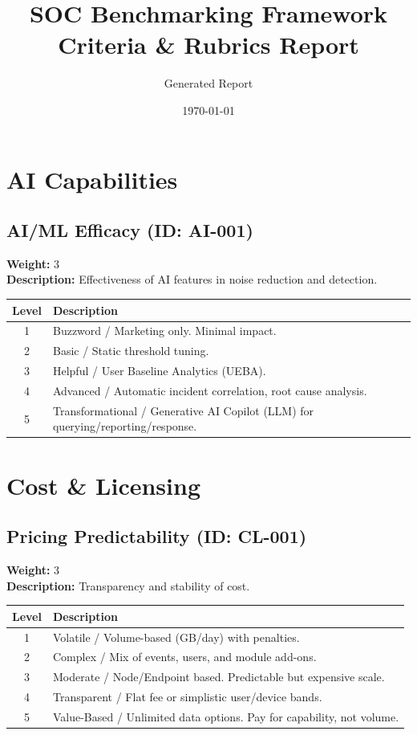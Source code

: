 \documentclass{article}
\title{SOC Benchmarking Framework \\ Criteria & Rubrics Report}
\author{Generated Report}
\date{\today}
\begin{document}
\maketitle
\tableofcontents
\newpage

\section{AI Capabilities}
\subsection{AI/ML Efficacy (ID: AI-001)}
\textbf{Weight:} 3 \\
\textbf{Description:} Effectiveness of AI features in noise reduction and detection.
\vspace{0.3cm}
\begin{longtable}{|c|p{12cm}|}
\hline
\rowcolor{lightgray} \textbf{Level} & \textbf{Description} \\ \hline
1 & Buzzword / Marketing only. Minimal impact. \\ \hline
2 & Basic / Static threshold tuning. \\ \hline
3 & Helpful / User Baseline Analytics (UEBA). \\ \hline
4 & Advanced / Automatic incident correlation, root cause analysis. \\ \hline
5 & Transformational / Generative AI Copilot (LLM) for querying/reporting/response. \\ \hline
\end{longtable}
\vspace{0.5cm}
\section{Cost \& Licensing}
\subsection{Pricing Predictability (ID: CL-001)}
\textbf{Weight:} 3 \\
\textbf{Description:} Transparency and stability of cost.
\vspace{0.3cm}
\begin{longtable}{|c|p{12cm}|}
\hline
\rowcolor{lightgray} \textbf{Level} & \textbf{Description} \\ \hline
1 & Volatile / Volume-based (GB/day) with penalties. \\ \hline
2 & Complex / Mix of events, users, and module add-ons. \\ \hline
3 & Moderate / Node/Endpoint based. Predictable but expensive scale. \\ \hline
4 & Transparent / Flat fee or simplistic user/device bands. \\ \hline
5 & Value-Based / Unlimited data options. Pay for capability, not volume. \\ \hline
\end{longtable}
\vspace{0.5cm}
\end{document}

